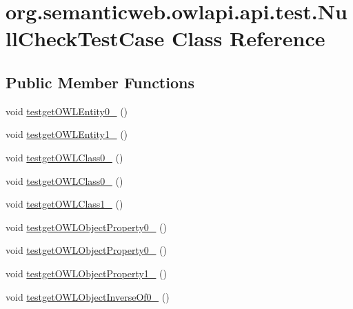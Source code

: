 \hypertarget{classorg_1_1semanticweb_1_1owlapi_1_1api_1_1test_1_1_null_check_test_case}{\section{org.\-semanticweb.\-owlapi.\-api.\-test.\-Null\-Check\-Test\-Case Class Reference}
\label{classorg_1_1semanticweb_1_1owlapi_1_1api_1_1test_1_1_null_check_test_case}
}
\subsection*{Public Member Functions}
\begin{DoxyCompactItemize}
\item 
void \hyperlink{classorg_1_1semanticweb_1_1owlapi_1_1api_1_1test_1_1_null_check_test_case_a7a59e2ce2aeff35dcd7336f520ed4787}{testget\-O\-W\-L\-Entity0\-\_} ()
\item 
void \hyperlink{classorg_1_1semanticweb_1_1owlapi_1_1api_1_1test_1_1_null_check_test_case_a6de8871054fa0dbe304ece36135f2490}{testget\-O\-W\-L\-Entity1\-\_} ()
\item 
void \hyperlink{classorg_1_1semanticweb_1_1owlapi_1_1api_1_1test_1_1_null_check_test_case_a8e47598b3b851ef12109b5419ccfb9b9}{testget\-O\-W\-L\-Class0\-\_} ()
\item 
void \hyperlink{classorg_1_1semanticweb_1_1owlapi_1_1api_1_1test_1_1_null_check_test_case_ad0e9cd07128808a6dbca435067c998cf}{testget\-O\-W\-L\-Class0\-\_} ()
\item 
void \hyperlink{classorg_1_1semanticweb_1_1owlapi_1_1api_1_1test_1_1_null_check_test_case_a64d789905356a40ab37a2e8626fe8c30}{testget\-O\-W\-L\-Class1\-\_} ()
\item 
void \hyperlink{classorg_1_1semanticweb_1_1owlapi_1_1api_1_1test_1_1_null_check_test_case_a5c82273e4c6bff84a907f80292738ce9}{testget\-O\-W\-L\-Object\-Property0\-\_} ()
\item 
void \hyperlink{classorg_1_1semanticweb_1_1owlapi_1_1api_1_1test_1_1_null_check_test_case_a50882950b1983cd72607555393bc0429}{testget\-O\-W\-L\-Object\-Property0\-\_} ()
\item 
void \hyperlink{classorg_1_1semanticweb_1_1owlapi_1_1api_1_1test_1_1_null_check_test_case_a852d27122e337edc4067a78853cf5feb}{testget\-O\-W\-L\-Object\-Property1\-\_} ()
\item 
void \hyperlink{classorg_1_1semanticweb_1_1owlapi_1_1api_1_1test_1_1_null_check_test_case_a12f031cc98120860a791216eefbf69ca}{testget\-O\-W\-L\-Object\-Inverse\-Of0\-\_} ()

\end{DoxyCompactItemize}
